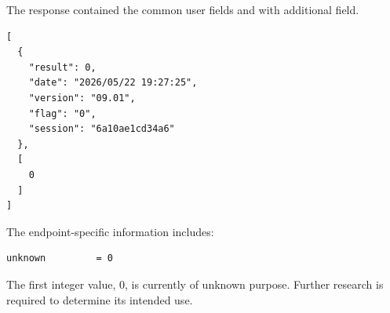 The response contained the common user fields and with additional field.

\begin{lstlisting}
[
  {
    "result": 0,
    "date": "2026/05/22 19:27:25",
    "version": "09.01",
    "flag": "0",
    "session": "6a10ae1cd34a6"
  },
  [
    0
  ]
]
\end{lstlisting}

The endpoint-specific information includes:

\begin{lstlisting}
unknown         = 0
\end{lstlisting}

\begin{tcolorbox}[colback=yellow!10,colframe=orange!80!black,title=Warning]
The first integer value, $0$, is currently of unknown purpose.
Further research is required to determine its intended use.
\end{tcolorbox}

\newpage